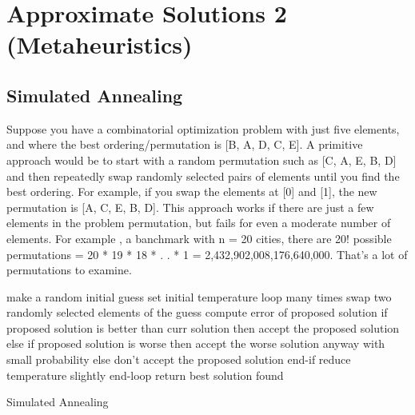 \chapter{Approximate Solutions 2 (Metaheuristics)}

    \section{Simulated Annealing}


    
    \begin{algorithm}

        Suppose you have a combinatorial optimization problem with just five elements, and where the best ordering/permutation is [B, A, D, C, E]. A primitive approach would be to start with a random permutation such as [C, A, E, B, D] and then repeatedly swap randomly selected pairs of elements until you find the best ordering. For example, if you swap the elements at [0] and [1], the new permutation is [A, C, E, B, D].
      This approach works if there are just a few elements in the problem permutation, but fails for even a moderate number of elements. For example , a banchmark with n = 20 cities, there are 20! possible permutations = 20 * 19 * 18 * . . * 1 = 2,432,902,008,176,640,000. That's a lot of permutations to examine.
      \begin{the psedo algorithm}

        
      make a random initial guess
      set initial temperature
      loop many times
        swap two randomly selected elements of the guess
        compute error of proposed solution
        if proposed solution is better than curr solution then
          accept the proposed solution
        else if proposed solution is worse then
          accept the worse solution anyway with small probability
        else
          don't accept the proposed solution
        end-if
        reduce temperature slightly
      end-loop
      return best solution found



        \caption{Simulated Annealing \TSP}
        \label{algo:simulated-annealing}



\end{the psedo algorithm}
\end{algorithm}
